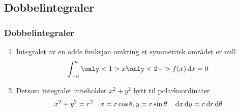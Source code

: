 \begin{frame}
  \subsection{Dobbelintegraler}\label{subsec:Dobbelintegraler}
  \frametitle{Dobbelintegraler}
  \begin{enumerate}
    \item Integralet av en odde funksjon omkring et symmetrisk området er null
      \begin{equation*}
        \int_{-a}^{a} \only<1>{x}\only<2->{f(x)} \dx = 0
      \end{equation*}
    \item Dersom integralet inneholder $x^2 + y^2$ bytt til polarkoordinater
      \begin{equation*}
        x^2 + y^2 = r^2 \quad x = r \cos \theta, y = r \sin \theta \quad \dx \dy = r \dd r \dT
      \end{equation*}

  \end{enumerate}
\end{frame}

